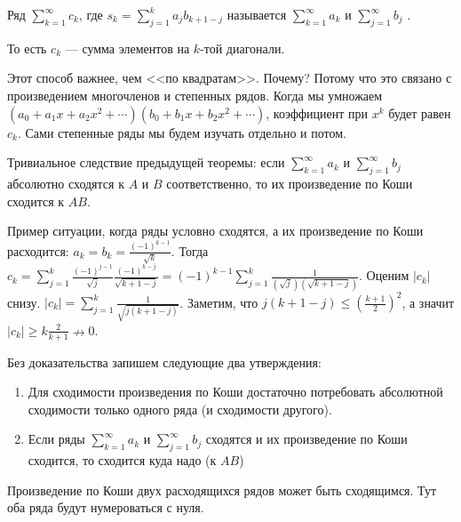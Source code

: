 \documentclass{article}
\begin{document}
\begin{itemize}
\begin{Proof}
        \end{Proof}
        \dfn Ряд $\sum\limits_{k=1}^\infty c_k$, где $s_k=\sum\limits_{j=1}^ka_jb_{k+1-j}$ называется  $\sum\limits_{k=1}^\infty a_k$ и $\sum\limits_{j=1}^\infty b_j$ .
        \begin{Comment}
            То есть $c_k$ --- сумма элементов на $k$-той диагонали.
        \end{Comment}
        \begin{Comment}
            Этот способ важнее, чем <<по квадратам>>. Почему? Потому что это связано с произведением многочленов и степенных рядов. Когда мы умножаем $(a_0+a_1x+a_2x^2+\cdots)(b_0+b_1x+b_2x^2+\cdots)$, коэффициент при $x^k$ будет равен $c_k$. Сами степенные ряды мы будем изучать отдельно и потом.
        \end{Comment}
        \thm Тривиальное следствие предыдущей теоремы: если $\sum\limits_{k=1}^\infty a_k$ и $\sum\limits_{j=1}^\infty b_j$ абсолютно сходятся к $A$ и $B$ соответственно, то их произведение по Коши сходится к $AB$.
        \begin{Example}
            Пример ситуации, когда ряды условно сходятся, а их произведение по Коши расходится:
            $a_k=b_k=\frac{(-1)^{k-1}}{\sqrt k}$. Тогда $c_k=\sum\limits_{j=1}^k \frac{(-1)^{j-1}}{\sqrt j}\frac{(-1)^{k-j}}{\sqrt{k+1-j}}=(-1)^{k-1}\sum\limits_{j=1}^k\frac1{(\sqrt j)(\sqrt{k+1-j})}$. Оценим $|c_k|$ снизу. $|c_k|=\sum\limits_{j=1}^k\frac1{\sqrt{j(k+1-j)}}$. Заметим, что $j(k+1-j)\leqslant\left(\frac{k+1}2\right)^2$, а значит $|c_k|\geqslant k\frac2{k+1}\nrightarrow0$.
        \end{Example}
        \begin{Comment}
            Без доказательства запишем следующие два утверждения:
            \begin{enumerate}
                \item Для сходимости произведения по Коши достаточно потребовать абсолютной сходимости только одного ряда (и сходимости другого).
                \item Если ряды $\sum\limits_{k=1}^\infty a_k$ и $\sum\limits_{j=1}^\infty b_j$ сходятся и их произведение по Коши сходится, то сходится куда надо (к $AB$)
            \end{enumerate}
        \end{Comment}
        \begin{Example}
            Произведение по Коши двух расходящихся рядов может быть сходящимся. Тут оба ряда будут нумероваться с нуля.

\end{Example}
\end{itemize}
\end{document}
